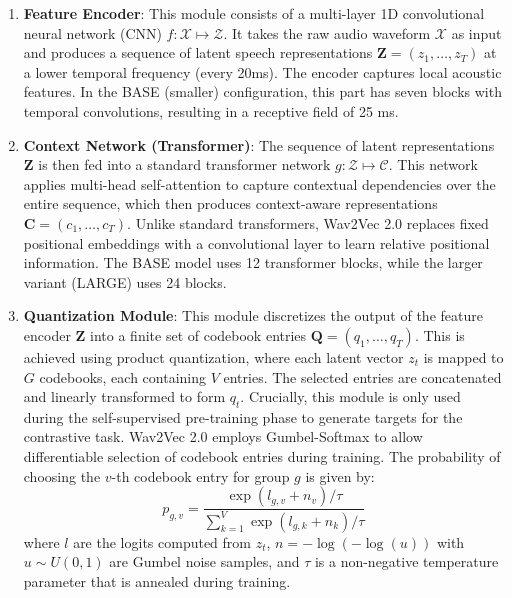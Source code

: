 \begin{enumerate}
    \item \textbf{Feature Encoder}: This module consists of a multi-layer 1D convolutional neural network (CNN) \( f: \mathcal{X} \mapsto \mathcal{Z} \). It takes the raw audio waveform \( \mathcal{X} \) as input and produces a sequence of latent speech representations \( \mathbf{Z} = (z_1, \dots, z_T) \) at a lower temporal frequency (every 20ms). The encoder captures local acoustic features. In the BASE (smaller) configuration, this part has seven blocks with temporal convolutions, resulting in a receptive field of 25 ms.

    \item \textbf{Context Network (Transformer)}: The sequence of latent representations \( \mathbf{Z} \) is then fed into a standard transformer network \( g: \mathcal{Z} \mapsto \mathcal{C} \). This network applies multi-head self-attention to capture contextual dependencies over the entire sequence, which then produces context-aware representations \( \mathbf{C} = (c_1, \dots, c_T) \). Unlike standard transformers, Wav2Vec 2.0 replaces fixed positional embeddings with a convolutional layer to learn relative positional information. The BASE model uses 12 transformer blocks, while the larger variant (LARGE) uses 24 blocks.

    \item \textbf{Quantization Module}: This module discretizes the output of the feature encoder \( \mathbf{Z} \) into a finite set of codebook entries \( \mathbf{Q} = (q_1, \dots, q_T) \). This is achieved using product quantization, where each latent vector \( z_t \) is mapped to \( G \) codebooks, each containing \( V \) entries. The selected entries are concatenated and linearly transformed to form \( q_t \). Crucially, this module is only used during the self-supervised pre-training phase to generate targets for the contrastive task. Wav2Vec 2.0 employs Gumbel-Softmax \cite{jang2016categorical} to allow differentiable selection of codebook entries during training. The probability of choosing the \( v \)-th codebook entry for group \( g \) is given by:
    \begin{equation} \label{eq:gumbel_softmax}
        p_{g,v} = \frac{\exp(l_{g,v} + n_v)/\tau}{\sum_{k=1}^{V} \exp(l_{g,k} + n_k)/\tau}
    \end{equation}
    where \( l \) are the logits computed from \( z_t \), \( n = -\log(-\log(u)) \) with \( u \sim U(0, 1) \) are Gumbel noise samples, and \( \tau \) is a non-negative temperature parameter that is annealed during training.
\end{enumerate}

